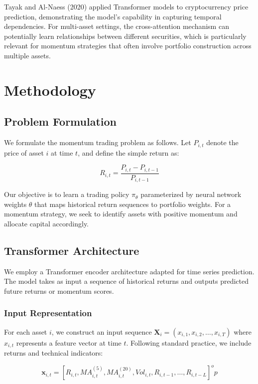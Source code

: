 \documentclass[preprint,authoryear,12pt]{elsarticle}
\begin{document}
Tayak and Al-Naess (2020) applied Transformer models to cryptocurrency price prediction, demonstrating the model's capability in capturing temporal dependencies. For multi-asset settings, the cross-attention mechanism can potentially learn relationships between different securities, which is particularly relevant for momentum strategies that often involve portfolio construction across multiple assets.

\section{Methodology}

\subsection{Problem Formulation}

We formulate the momentum trading problem as follows. Let $P_{i,t}$ denote the price of asset $i$ at time $t$, and define the simple return as:

\begin{equation}
R_{i,t} = \frac{P_{i,t} - P_{i,t-1}}{P_{i,t-1}}
\end{equation}

Our objective is to learn a trading policy $\pi_\theta$ parameterized by neural network weights $\theta$ that maps historical return sequences to portfolio weights. For a momentum strategy, we seek to identify assets with positive momentum and allocate capital accordingly.

\subsection{Transformer Architecture}

We employ a Transformer encoder architecture adapted for time series prediction. The model takes as input a sequence of historical returns and outputs predicted future returns or momentum scores.

\subsubsection{Input Representation}

For each asset $i$, we construct an input sequence $\mathbf{X}_i = (x_{i,1}, x_{i,2}, \ldots, x_{i,T})$ where $x_{i,t}$ represents a feature vector at time $t$. Following standard practice, we include returns and technical indicators:

\begin{equation}
\mathbf{x}_{i,t} = [R_{i,t}, MA_{i,t}^{(5)}, MA_{i,t}^{(20)}, Vol_{i,t}, R_{i,t-1}, \ldots, R_{i,t-L}]^	op
\end{equation}
\end{document}
